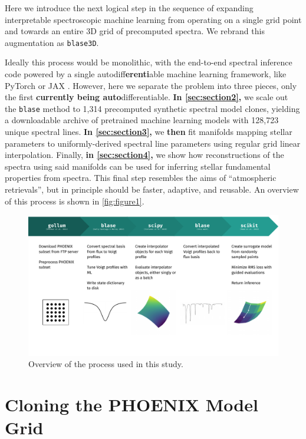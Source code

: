 \documentclass[twocolumn, linenumbers]{aastex631}
\begin{document}
Here we introduce the next logical step in the sequence of expanding interpretable spectroscopic machine learning from operating on a single grid point and towards an entire 3D grid of precomputed spectra.
We rebrand this augmentation as \texttt{blase3D}.

Ideally this process would be monolithic, with the end-to-end spectral inference code powered by a single autodiff\textbf{erenti}able machine learning framework, like PyTorch \textbf{\citep{pytorch}} or JAX \citep{jax}.
However, here we separate the problem into three pieces, only the first \textbf{currently being auto}differentiable.
\textbf{In \autoref{sec:section2},} we scale out the \texttt{blase} method to 1,314 precomputed synthetic spectral model clones, yielding a downloadable archive of pretrained machine learning models with 128,723 unique spectral lines.
\textbf{In \autoref{sec:section3},} we \textbf{then} fit manifolds mapping stellar parameters to uniformly-derived spectral line parameters using regular grid linear interpolation.
Finally, \textbf{in \autoref{sec:section4},} we show how reconstructions of the spectra using said manifolds can be used for inferring stellar fundamental properties from spectra.
This final step resembles the aims of ``atmospheric retrievals'', but in principle should be faster, adaptive, and reusable.
An overview of this process is shown in \autoref{fig:figure1}.

\begin{figure}
    \centering
    \includegraphics[width=\textwidth]{figure1}
    \caption{Overview of the process used in this study.}
    \label{fig:figure1}
\end{figure}


\section{Cloning the PHOENIX Model Grid}
\label{sec:section2}
\end{document}
